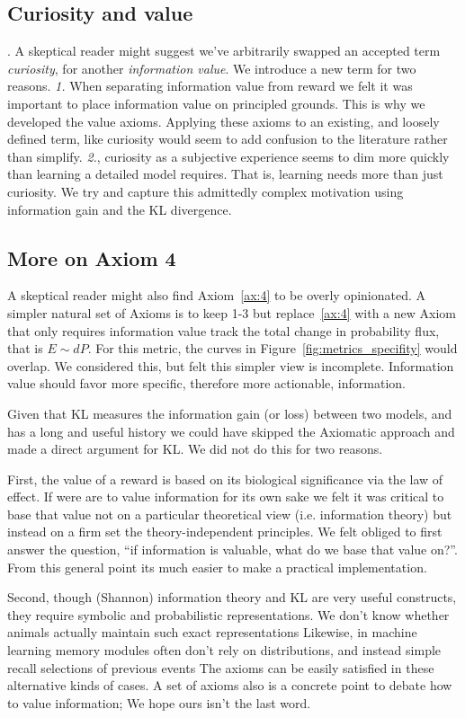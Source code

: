 \documentclass[9pt,twocolumn,twoside]{pnas-new}
\begin{document}
\subsection*{Curiosity and value}.
A skeptical reader might suggest we've arbitrarily swapped an accepted term \textit{curiosity}, for another \textit{information value}. We introduce a new term for two reasons. \textit{1.} When separating information value from reward we felt it was important to place information value on principled grounds. This is why we developed the value axioms. Applying these axioms to an existing, and loosely defined term, like curiosity would seem to add confusion to the literature rather than simplify. \textit{2.}, curiosity as a subjective experience seems to dim more quickly than learning a detailed model requires. That is, learning needs more than just curiosity. We try and capture this admittedly complex motivation using information gain and the KL divergence.


\subsection*{More on Axiom 4}
A skeptical reader might also find Axiom~\ref{ax:4} to be overly opinionated. A simpler natural set of Axioms is to keep 1-3 but replace~\ref{ax:4} with a new Axiom  that only requires information value track the total change in probability flux, that is $E \sim dP$. For this metric, the curves in Figure~\ref{fig:metrics_specifity} would overlap. We considered this, but felt this simpler view is incomplete. Information value should favor more specific, therefore more actionable, information. 

Given that KL measures the information gain (or loss) between two models, and has a long and useful history %
we could have skipped the Axiomatic approach and made a direct argument for KL. We did not do this for two reasons. 

First, the value of a reward is based on its biological significance via the law of effect. If were are to value information for its own sake we felt it was critical to base that value not on a particular theoretical view (i.e. information theory) but instead on a firm set the theory-independent principles. We felt obliged to first answer the question, ``if information is valuable, what do we base that value on?''. From this general point its much easier to make a practical implementation. 

Second, though (Shannon) information theory and KL are very useful constructs, they require symbolic and probabilistic representations. We don't know whether animals actually maintain such exact representations %
Likewise, in machine learning memory modules often don't rely on distributions, and instead simple recall selections of previous events %
The axioms can be easily satisfied in these alternative kinds of cases. A set of axioms also is a concrete point to debate how to value information; We hope ours isn't the last word.
\end{document}
